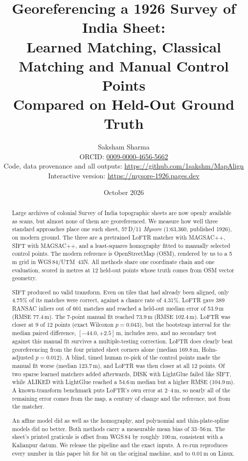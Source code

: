\documentclass[10pt,twocolumn]{article}
\title{\vspace{-6mm}\Large\bfseries Georeferencing a 1926 Survey of India Sheet:\\ Learned Matching, Classical Matching and Manual Control Points\\ Compared on Held-Out Ground Truth}
\author{Saksham Sharma\\[2pt]
\normalsize ORCID: \href{https://orcid.org/0009-0000-4656-5662}{0009-0000-4656-5662}\\
\normalsize Code, data provenance and all outputs: \url{https://github.com/1sakshm/MapAlign}\\
\normalsize Interactive version: \url{https://mysore-1926.pages.dev}}
\date{October 2026}
\newcommand{\metre}{\,m}
\begin{document}
\maketitle

\begin{abstract}
\noindent
Large archives of colonial Survey of India topographic sheets are now openly available as scans, but almost none of them are georeferenced. We measure how well three standard approaches place one such sheet, 57\,D/11 \emph{Mysore} (1:63,360, published 1926), on modern ground. The three are a pretrained LoFTR matcher with MAGSAC++, SIFT with MAGSAC++, and a least-squares homography fitted to manually selected control points. The modern reference is OpenStreetMap (OSM), rendered by us to a 5\,m grid in WGS\,84/UTM~43N. All methods share one coordinate chain and one evaluation, scored in metres at 12 held-out points whose truth comes from OSM vector geometry.

SIFT produced no valid transform. Even on tiles that had already been aligned, only 4.75\% of its matches were correct, against a chance rate of 4.31\%. LoFTR gave 389 RANSAC inliers out of 601 matches and reached a held-out median error of 53.9\metre{} (RMSE 77.4\metre). The 7-point manual fit reached 73.9\metre{} (RMSE 102.4\metre). LoFTR was closer at 9 of 12 points (exact Wilcoxon $p=0.043$), but the bootstrap interval for the median paired difference, $[-44.0, +2.5]$\metre, includes zero, and no secondary test against this manual fit survives a multiple-testing correction. LoFTR does clearly beat georeferencing from the four printed sheet corners alone (median 169.8\metre, Holm-adjusted $p=0.012$). A blind, timed human re-pick of the control points made the manual fit worse (median 123.7\metre), and LoFTR was then closer at all 12 points. Of two sparse learned matchers added afterwards, DISK with LightGlue failed like SIFT, while ALIKED with LightGlue reached a 54.6\metre{} median but a higher RMSE (104.9\metre). A known-transform benchmark puts LoFTR's own error at 2--4\metre, so nearly all of the remaining error comes from the map, a century of change and the reference, not from the matcher.

An affine model did as well as the homography, and polynomial and thin-plate-spline models did no better. Both methods carry a measurable mean bias of 33--56\metre. The sheet's printed graticule is offset from WGS\,84 by roughly 100\metre, consistent with a Kalianpur datum. We release the pipeline and the exact inputs. A re-run reproduces every number in this paper bit for bit on the original machine, and to 0.01\metre{} on Linux.
\end{abstract}
\end{document}
